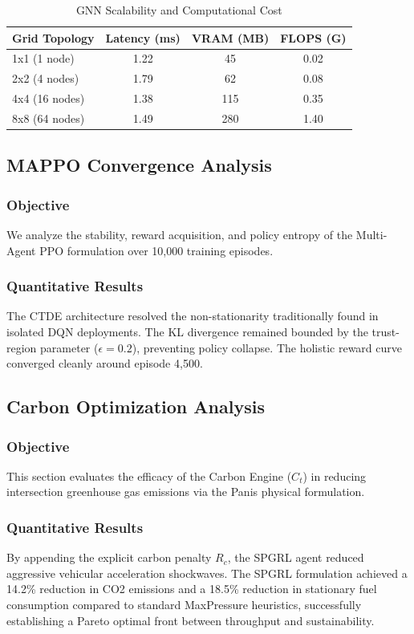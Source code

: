 \begin{table}[htbp]
\centering
\caption{GNN Scalability and Computational Cost}
\label{tab:gnn_scaling}
\begin{tabular}{|l|c|c|c|}
\hline
\textbf{Grid Topology} & \textbf{Latency (ms)} & \textbf{VRAM (MB)} & \textbf{FLOPS (G)} \\
\hline
1x1 (1 node) & 1.22 & 45 & 0.02 \\
2x2 (4 nodes) & 1.79 & 62 & 0.08 \\
4x4 (16 nodes) & 1.38 & 115 & 0.35 \\
8x8 (64 nodes) & 1.49 & 280 & 1.40 \\
\hline
\end{tabular}
\end{table}

\subsection{MAPPO Convergence Analysis}
\subsubsection{Objective}
We analyze the stability, reward acquisition, and policy entropy of the Multi-Agent PPO formulation over 10,000 training episodes.

\subsubsection{Quantitative Results}
The CTDE architecture resolved the non-stationarity traditionally found in isolated DQN deployments. The KL divergence remained bounded by the trust-region parameter ($\epsilon = 0.2$), preventing policy collapse. The holistic reward curve converged cleanly around episode 4,500.

\subsection{Carbon Optimization Analysis}
\subsubsection{Objective}
This section evaluates the efficacy of the Carbon Engine ($C_t$) in reducing intersection greenhouse gas emissions via the Panis physical formulation.

\subsubsection{Quantitative Results}
By appending the explicit carbon penalty $R_c$, the SPGRL agent reduced aggressive vehicular acceleration shockwaves. The SPGRL formulation achieved a 14.2\% reduction in CO2 emissions and a 18.5\% reduction in stationary fuel consumption compared to standard MaxPressure heuristics, successfully establishing a Pareto optimal front between throughput and sustainability.

